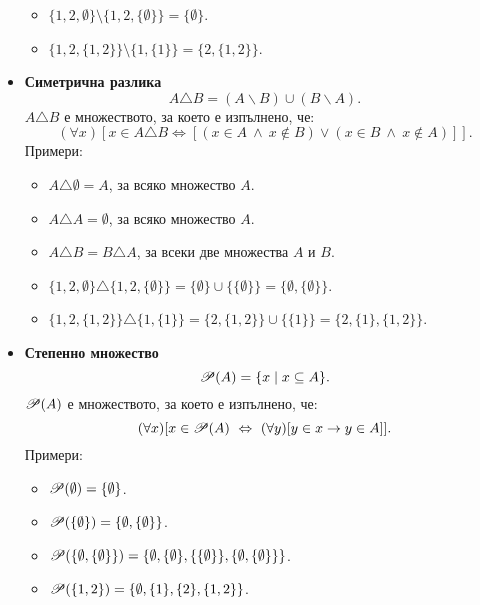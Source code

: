 \begin{itemize}
\begin{itemize}
  \item
    $\{1,2,\emptyset\} \setminus \{1,2,\{\emptyset\}\} = \{\emptyset\}$.
  \item
    $\{1,2,\{1,2\}\} \setminus \{1,\{1\}\} = \{2,\{1,2\}\}$.
  \end{itemize}
\item
  {\bf Симетрична разлика}
  \[A\triangle B = (A\backslash B)\cup (B\backslash A).\]
  $A\triangle B$ е множеството, за което е изпълнено, че:
  \[(\forall x)[x \in A\triangle B \iff [(x\in A\ \land\ x \not\in B) \vee (x \in B\ \land\ x\not\in A)]].\]
  Примери:
  \begin{itemize}
  \item 
    $A \triangle \emptyset = A$, за всяко множество $A$.
  \item
    $A \triangle A = \emptyset$, за всяко множество $A$.
  \item
    $A\triangle B = B \triangle A$, за всеки две множества $A$ и $B$.
  \item
    $\{1,2,\emptyset\} \triangle \{1,2,\{\emptyset\}\} = \{\emptyset\} \cup \{\{\emptyset\}\} = \{\emptyset,\{\emptyset\}\}$.
  \item
    $\{1,2,\{1,2\}\} \triangle \{1,\{1\}\} = \{2,\{1,2\}\} \cup \{\{1\}\} = \{2,\{1\},\{1,2\}\}$.
  \end{itemize}
\item
  {\bf Степенно множество}
  \[\mathscr{P}(A) = \{x\mid x\subseteq A\}.\]
  $\mathscr{P}(A)$ е множеството, за което е изпълнено, че:
  \[(\forall x)[x \in \mathscr{P}(A) \ \Leftrightarrow\  (\forall y)[y\in x\rightarrow y \in A]].\]
  Примери:
  \begin{itemize}
  \item 
    $\mathscr{P}(\emptyset) = \{\emptyset\}$.
  \item
    $\mathscr{P}(\{\emptyset\}) = \{\emptyset,\{\emptyset\}\}$.
  \item
    $\mathscr{P}(\{\emptyset,\{\emptyset\}\}) = \{\emptyset,\{\emptyset\},\{\{\emptyset\}\},\{\emptyset,\{\emptyset\}\}\}$.
  \item
    $\mathscr{P}(\{1,2\}) = \{\emptyset,\{1\},\{2\},\{1,2\}\}$.
  \end{itemize}
\end{itemize}

